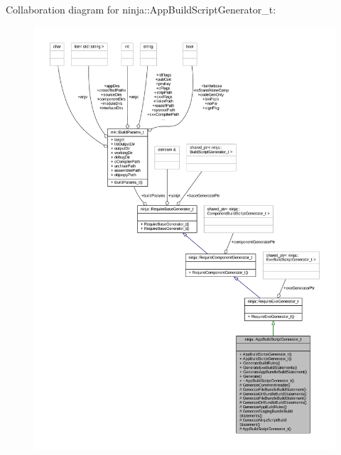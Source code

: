 Collaboration diagram for ninja\+:\+:App\+Build\+Script\+Generator\+\_\+t\+:
\nopagebreak
\begin{figure}[H]
\begin{center}
\leavevmode
\includegraphics[width=350pt]{classninja_1_1_app_build_script_generator__t__coll__graph}
\end{center}
\end{figure}
